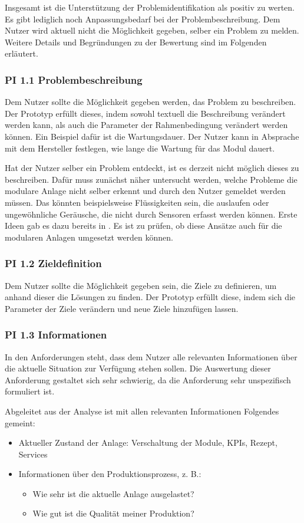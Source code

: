 Insgesamt ist die Unterstützung der Problemidentifikation als positiv zu werten. Es gibt lediglich noch Anpassungsbedarf bei der Problembeschreibung. Dem Nutzer wird aktuell nicht die Möglichkeit gegeben, selber ein Problem zu melden. Weitere Details und Begründungen zu der Bewertung sind im Folgenden erläutert.

\subsubsection*{PI 1.1 Problembeschreibung}
Dem Nutzer sollte die Möglichkeit gegeben werden, das Problem zu beschreiben. Der Prototyp erfüllt dieses, indem sowohl textuell die Beschreibung verändert werden kann, als auch die Parameter der Rahmenbedingung verändert werden können. Ein Beispiel dafür ist die Wartungsdauer. Der Nutzer kann in Absprache mit dem Hersteller festlegen, wie lange die Wartung für das Modul dauert.

Hat der Nutzer selber ein Problem entdeckt, ist es derzeit nicht möglich dieses zu beschreiben. Dafür muss zunächst näher untersucht werden, welche Probleme die modulare Anlage nicht selber erkennt und durch den Nutzer gemeldet werden müssen. Das könnten beispielsweise Flüssigkeiten sein, die auslaufen oder ungewöhnliche Geräusche, die nicht durch Sensoren erfasst werden können. Erste Ideen gab es dazu bereits in \cite{Bieber2018}. Es ist zu prüfen, ob diese Ansätze auch für die modularen Anlagen umgesetzt werden können.

\subsubsection*{PI 1.2 Zieldefinition}
Dem Nutzer sollte die Möglichkeit gegeben sein, die Ziele zu definieren, um anhand dieser die Lösungen zu finden. Der Prototyp erfüllt diese, indem sich die Parameter der Ziele verändern und neue Ziele hinzufügen lassen.

\subsubsection*{PI 1.3 Informationen}
In den Anforderungen steht, dass dem Nutzer alle relevanten Informationen über die aktuelle Situation zur Verfügung stehen sollen. Die Auswertung dieser Anforderung gestaltet sich sehr schwierig, da die Anforderung sehr unspezifisch formuliert ist.

Abgeleitet aus der Analyse ist mit allen relevanten Informationen Folgendes gemeint:
\begin{itemize}
\item Aktueller Zustand der Anlage: Verschaltung der Module, KPIs, Rezept, Services
\item Informationen über den Produktionsprozess, z. B.:
	\begin{itemize}
	\item Wie sehr ist die aktuelle Anlage ausgelastet?
	\item Wie gut ist die Qualität meiner Produktion?
\end{itemize}
\end{itemize}

